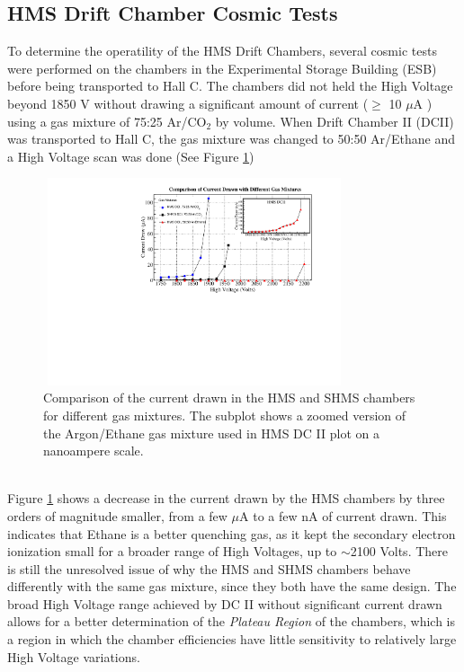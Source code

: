 \documentclass[letterpaper, 12 pt, conference]{ieeeconf}  %
\begin{document}
\subsection{HMS Drift Chamber Cosmic Tests}
\noindent To determine the operatility of the HMS Drift Chambers, several cosmic tests were performed on the chambers in the Experimental Storage Building (ESB) before being transported
to Hall C. The chambers did not held the High Voltage beyond 1850 V without drawing a significant amount of current ($\geq$ 10 $\mu$A ) using a gas mixture of 75:25 Ar/CO$_{2}$ by
volume. When Drift Chamber II (DCII) was transported to Hall C, the gas mixture was changed to 50:50 Ar/Ethane and a High Voltage scan was done (See Figure \ref{fig:current_draw})  
\begin{figure}[h!]
  \centering
  \includegraphics[width=3.5in, height=2.4in]{dc2_tests/gas_mix_current_drawn.pdf}
  \caption{Comparison of the current drawn in the HMS and SHMS chambers for different gas mixtures. The subplot shows a zoomed version of the Argon/Ethane gas mixture used in HMS DC II plot on a nanoampere scale.}
  \label{fig:current_draw}
\end{figure} \\
Figure \ref{fig:current_draw} shows a decrease in the current drawn by the HMS chambers by three orders of magnitude smaller, from a few $\mu$A to a few nA of current drawn. This
indicates that Ethane is a better quenching gas, as it kept the secondary electron ionization small for a broader range of High Voltages, up to $\sim$2100 Volts. There is still the
unresolved issue of why the HMS and SHMS chambers behave differently with the same gas mixture, since they both have the same design. The broad High Voltage range achieved by DC II without
significant current drawn allows for a better determination of the \textit{Plateau Region} of the chambers, which is a region in which the chamber efficiencies have little sensitivity
to relatively large High Voltage variations. \\
\end{document}
